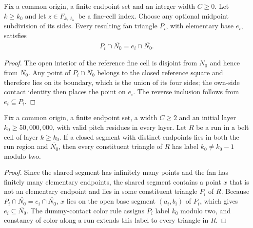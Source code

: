 \begin{lemma}
    \label{thm:area_law_fan_dummy_contact}
    \leanok
    Fix a common origin, a finite endpoint set and an integer width $C\ge0$.
    Let $k\ge k_0$ and let $z\in F_{k,\ell_k}$ be a fine-cell index.
    Choose any optional midpoint subdivision of its sides. Every resulting
    fan triangle $P_i$, with elementary base $e_i$, satisfies
    \begin{align}
        P_i\cap\overline{N_0}=e_i\cap\overline{N_0}.
    \end{align}
\end{lemma}
\begin{proof}\leanok
    The open interior
    of the reference fine cell is disjoint from $N_0$ and hence from
    $\overline{N_0}$. Any point of $P_i\cap\overline{N_0}$ belongs to the
    closed reference square and therefore lies on its boundary, which is
    the union of its four sides; the own-side contact identity
    then places the point on $e_i$. The reverse inclusion follows from
    $e_i\subseteq P_i$.
\end{proof}

\begin{lemma}
    \label{thm:area_law_belt_run_dummy_interface}
    \leanok
    Fix a common origin, a finite endpoint set, a width $C\ge 2$ and an
    initial layer $k_0\ge 50{,}000{,}000$, with valid pitch residues in
    every layer. Let $R$ be a run in a belt cell of layer $k\ge k_0$. If
    a closed segment with distinct endpoints lies in both the run region
    and $\overline{N_0}$, then every constituent triangle of $R$ has label
    $k_0\ne k_0-1$ modulo two.
\end{lemma}
\begin{proof}\leanok
    Since the shared segment has infinitely many points and the fan has
    finitely many elementary endpoints, the shared segment contains a point $x$
    that is not an elementary endpoint and lies in some constituent
    triangle $P_i$ of $R$. Because $P_i\cap\overline{N_0}=e_i\cap\overline{N_0}$,
    $x$ lies on the open base
    segment $(a_i,b_i)$ of $P_i$, which gives $e_i\subseteq\overline{N_0}$.
    The dummy-contact color rule assigns $P_i$ label $k_0$
    modulo two, and constancy of color along a run extends this
    label to every triangle in $R$.
\end{proof}
